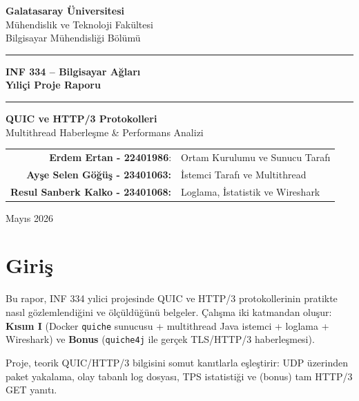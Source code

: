 \documentclass[12pt,a4paper]{article}
\begin{document}
\begin{titlepage}
  \centering
  \vspace*{1.5cm}
  {\Large \textbf{Galatasaray Üniversitesi}\\
  Mühendislik ve Teknoloji Fakültesi\\
  Bilgisayar Mühendisliği Bölümü}
  \vspace{1cm}
  \rule{\linewidth}{0.5mm}
  \vspace{0.5cm}
  {\LARGE \textbf{INF 334 – Bilgisayar Ağları}\\[0.4cm]
   \huge \textbf{Yıliçi Proje Raporu}}
  \vspace{0.5cm}
  \rule{\linewidth}{0.5mm}
  \vspace{1.5cm}
  {\Large \textbf{QUIC ve HTTP/3 Protokolleri}\\[0.3cm]
   \large Multithread Haberleşme \& Performans Analizi}
  \vspace{2cm}
  \begin{tabular}{rl}
    \textbf{Erdem Ertan - 22401986}: & Ortam Kurulumu ve Sunucu Tarafı \\[4pt]
    \textbf{Ayşe Selen Göğüş - 23401063:} & İstemci Tarafı ve Multithread \\[4pt]
    \textbf{Resul Sanberk Kalko - 23401068:} & Loglama, İstatistik ve Wireshark \\[4pt]
  \end{tabular}
  \vfill
  {\small Mayıs 2026}
\end{titlepage}

\tableofcontents
\newpage

\section{Giriş}

Bu rapor, INF 334 yılici projesinde QUIC ve HTTP/3 protokollerinin
pratikte nasıl gözlemlendiğini ve ölçüldüğünü belgeler. Çalışma iki
katmandan oluşur: \textbf{Kısım I} (Docker \texttt{quiche} sunucusu +
multithread Java istemci + loglama + Wireshark) ve \textbf{Bonus}
(\texttt{quiche4j} ile gerçek TLS/HTTP/3 haberleşmesi).

Proje, teorik QUIC/HTTP/3 bilgisini somut kanıtlarla eşleştirir: UDP
üzerinden paket yakalama, olay tabanlı log dosyası, TPS istatistiği ve
(bonus) tam HTTP/3 GET yanıtı.

\end{document}
